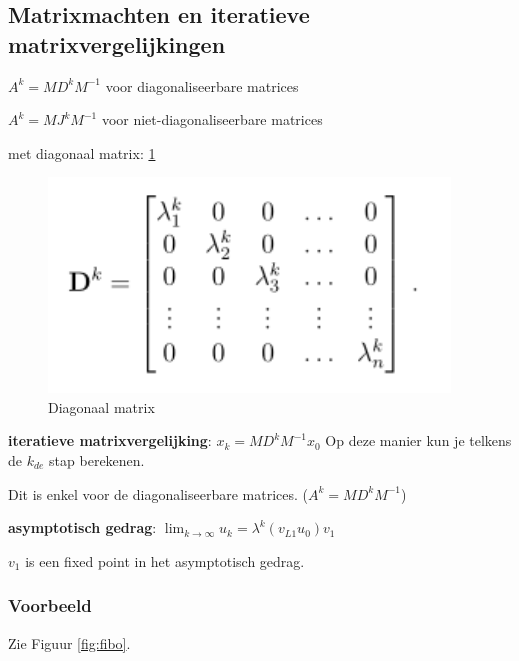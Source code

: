 \documentclass[a4paper]{report}
\begin{document}
\subsection{Matrixmachten en iteratieve matrixvergelijkingen}

$A^k = M D^k M^{-1}$ voor diagonaliseerbare matrices

$A^k = M J^k M^{-1}$ voor niet-diagonaliseerbare matrices

met diagonaal matrix: \ref{fig:diag}

\begin{figure}[H]
	\begin{center}
		\includegraphics[width=0.95\textwidth]{./images/diag.png}
	\end{center}
	\caption{Diagonaal matrix}
	\label{fig:diag}
\end{figure}

\textbf{iteratieve matrixvergelijking}: $x_k = M D^k M^{-1} x_0$ Op deze manier kun je telkens de $k_{de}$ stap berekenen.

Dit is enkel voor de diagonaliseerbare matrices. ($A^k = M D^k M^{-1}$)

\textbf{asymptotisch gedrag}: $\lim_{k \to \infty} u_k = \lambda^k (v_{L1} u_0) v_1$

$v_1$ is een fixed point in het asymptotisch gedrag.

\subsubsection{Voorbeeld}

Zie Figuur \ref{fig:fibo}.
\end{document}
